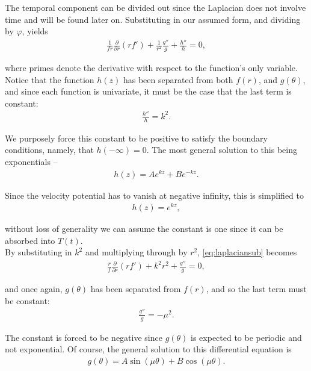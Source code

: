 The temporal component can be divided out since the Laplacian does not involve time and will be found later on. Substituting in our assumed form, and dividing by $\varphi$, yields
\begin{align}
\label{eq:laplaciansub}
\frac{1}{fr}\frac{\partial}{\partial r}(rf') + \frac{1}{r^2}\frac{g''}{g} + \frac{h''}{h} = 0,
\end{align}

where primes denote the derivative with respect to the function's only variable. Notice that the function $h(z)$ has been separated from both $f(r)$, and $g(\theta)$, and since each function is univariate, it must be the case that the last term is constant:
\begin{align*}
\frac{h''}{h} = k^2.
\end{align*}

We purposely force this constant to be positive to satisfy the boundary conditions, namely, that $h(-\infty) = 0$. The most general solution to this being exponentials --
\begin{align*}
h(z) = Ae^{kz} + Be^{-kz}.
\end{align*}

Since the velocity potential has to vanish at negative infinity, this is simplified to
\begin{align}
\label{eq:h}
h(z) = e^{kz},
\end{align}

without loss of generality we can assume the constant is one since it can be absorbed into $T(t)$. \\

By substituting in $k^2$ and multiplying through by $r^2$, \eqref{eq:laplaciansub} becomes
\begin{align}
\label{eq:laplacenoh}
\frac{r}{f}\frac{\partial}{\partial r} \left( rf' \right) + k^2r^2 + \frac{g''}{g} = 0,
\end{align}

and once again, $g(\theta)$ has been separated from $f(r)$, and so the last term must be constant:
\begin{align*}
\frac{g''}{g} = -\mu^2.
\end{align*}

The constant is forced to be negative since $g(\theta)$ is expected to be periodic and not exponential. Of course, the general solution to this differential equation is 
\begin{align*}
g(\theta) = A \sin(\mu \theta) + B \cos(\mu \theta).
\end{align*}

